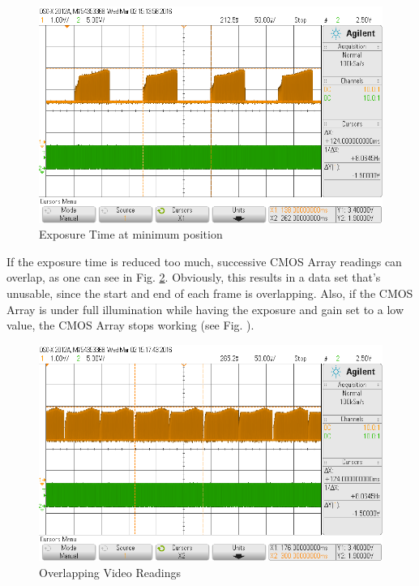 \begin{figure}[H]
\begin{center}
\includegraphics[scale=0.4]{LabFour/scope_66}
\end{center}
\caption{Exposure Time at minimum position}
\label{fig:expos3}
\end{figure}


If the exposure time is reduced too much, successive CMOS Array readings can overlap, as one can see in Fig. \ref{fig:expos4}.
Obviously, this results in a data set that's unusable, since the start and end of each frame is overlapping.
Also, if the CMOS Array is under full illumination while having the exposure and gain set to a low value, the CMOS Array stops working (see Fig. ).

\begin{figure}[H]
\begin{center}
\includegraphics[scale=0.4]{LabFour/scope_68}
\end{center}
\caption{Overlapping Video Readings}
\label{fig:expos4}
\end{figure}


